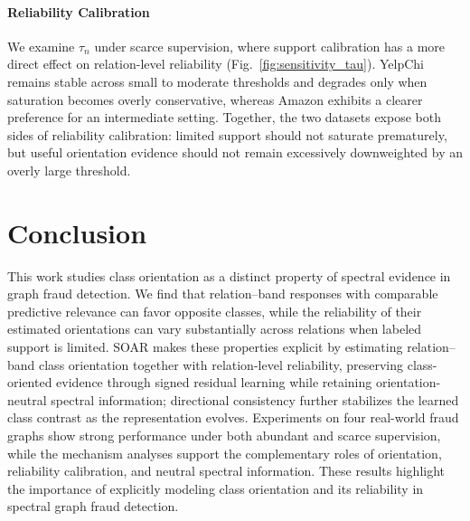 \documentclass[10pt,journal]{IEEEtran}
\begin{document}
\paragraph{Reliability Calibration} We examine $\tau_n$ under scarce supervision, where support calibration has a
more direct effect on relation-level reliability
(Fig.~\ref{fig:sensitivity_tau}). YelpChi remains stable across small to
moderate thresholds and degrades only when saturation becomes overly
conservative, whereas Amazon exhibits a clearer preference for an intermediate
setting. Together, the two datasets expose both sides of reliability
calibration: limited support should not saturate prematurely, but useful
orientation evidence should not remain excessively downweighted by an overly
large threshold.

\section{Conclusion}
\label{sec:conclusion}
This work studies class orientation as a distinct property of spectral
evidence in graph fraud detection. We find that relation--band responses with
comparable predictive relevance can favor opposite classes, while the
reliability of their estimated orientations can vary substantially across
relations when labeled support is limited. SOAR makes these properties
explicit by estimating relation--band class orientation together with
relation-level reliability, preserving class-oriented evidence through signed
residual learning while retaining orientation-neutral spectral information;
directional consistency further stabilizes the learned class contrast as the
representation evolves. Experiments on four real-world fraud graphs show
strong performance under both abundant and scarce supervision, while the
mechanism analyses support the complementary roles of orientation,
reliability calibration, and neutral spectral information. These results
highlight the importance of explicitly modeling class orientation and its
reliability in spectral graph fraud detection.



\end{document}
